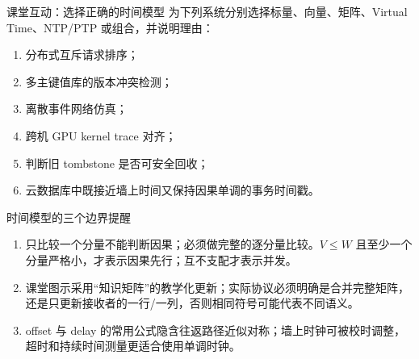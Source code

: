 \documentclass[UTF8,fontset=none,aspectratio=169,10pt]{beamer}
\begin{document}
\begin{frame}{课堂互动：选择正确的时间模型}
为下列系统分别选择标量、向量、矩阵、Virtual Time、NTP/PTP 或组合，并说明理由：
\begin{enumerate}
  \item 分布式互斥请求排序；
  \item 多主键值库的版本冲突检测；
  \item 离散事件网络仿真；
  \item 跨机 GPU kernel trace 对齐；
  \item 判断旧 tombstone 是否可安全回收；
  \item 云数据库中既接近墙上时间又保持因果单调的事务时间戳。
\end{enumerate}
\vfill
{}
\end{frame}

\begin{frame}{时间模型的三个边界提醒}
\small
\begin{enumerate}
  \item {}只比较一个分量不能判断因果；必须做完整的逐分量比较。\(V\leq W\) 且至少一个分量严格小，才表示因果先行；互不支配才表示并发。
  \item {}课堂图示采用“知识矩阵”的教学化更新；实际协议必须明确是合并完整矩阵，还是只更新接收者的一行/一列，否则相同符号可能代表不同语义。
  \item {}offset 与 delay 的常用公式隐含往返路径近似对称；墙上时钟可被校时调整，超时和持续时间测量更适合使用单调时钟。
\end{enumerate}
\vfill
{}
\end{frame}

\begin{frame}[plain]
\end{frame}
\end{document}
